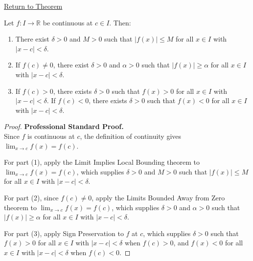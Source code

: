 \newpage
{}
\label{prf:local-properties-of-continuous-functions}

\begin{remark*}[Return]
\hyperref[thm:local-properties-of-continuous-functions]{Return to Theorem}
\end{remark*}

\begin{theorem*}
Let $f : I \to \mathbb{R}$ be continuous at $c \in I$. Then:
\begin{enumerate}[(1)]
\item There exist $\delta > 0$ and $M > 0$ such that $|f(x)| \leq M$ for all $x \in I$ with $|x - c| < \delta$.
\item If $f(c) \neq 0$, there exist $\delta > 0$ and $\alpha > 0$ such that $|f(x)| \geq \alpha$ for all $x \in I$ with $|x - c| < \delta$.
\item If $f(c) > 0$, there exists $\delta > 0$ such that $f(x) > 0$ for all $x \in I$ with $|x - c| < \delta$. If $f(c) < 0$, there exists $\delta > 0$ such that $f(x) < 0$ for all $x \in I$ with $|x - c| < \delta$.
\end{enumerate}
\end{theorem*}

\begin{proof}
\textbf{Professional Standard Proof.}~\\
Since $f$ is continuous at $c$, the definition of continuity gives $\lim_{x \to c} f(x) = f(c)$.

For part (1), apply the Limit Implies Local Bounding theorem to $\lim_{x \to c} f(x) = f(c)$, which supplies $\delta > 0$ and $M > 0$ such that $|f(x)| \leq M$ for all $x \in I$ with $|x - c| < \delta$.

For part (2), since $f(c) \neq 0$, apply the Limits Bounded Away from Zero theorem to $\lim_{x \to c} f(x) = f(c)$, which supplies $\delta > 0$ and $\alpha > 0$ such that $|f(x)| \geq \alpha$ for all $x \in I$ with $|x - c| < \delta$.

For part (3), apply Sign Preservation to $f$ at $c$, which supplies $\delta > 0$ such that $f(x) > 0$ for all $x \in I$ with $|x - c| < \delta$ when $f(c) > 0$, and $f(x) < 0$ for all $x \in I$ with $|x - c| < \delta$ when $f(c) < 0$.
\end{proof}

